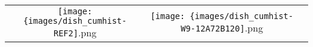  \begin{tabular}{ccc}
\texttt{[image: \{images/dish\_cumhist-REF2]}.png} &\texttt{[image: \{images/dish\_cumhist-W9-12A72B120]}.png} & 
 \\ \end{tabular}